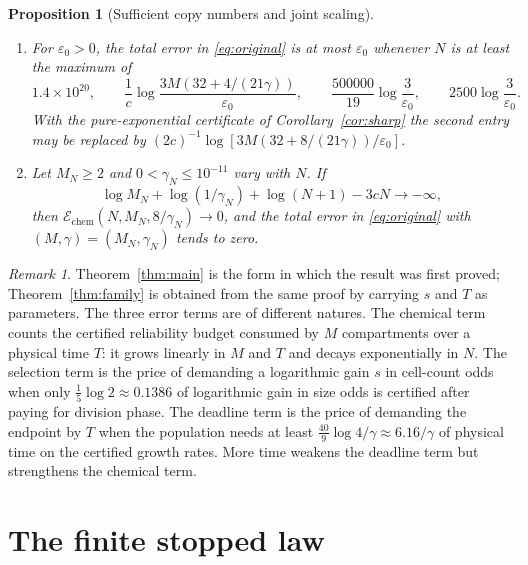 \documentclass[11pt,a4paper]{article}
\theoremstyle{plain}
\newtheorem{proposition}[theorem]{Proposition}
\theoremstyle{definition}
\theoremstyle{remark}
\newtheorem{remark}[theorem]{Remark}
\newcommand{\eps}{\varepsilon}
\newcommand{\chem}{\mathcal E_{\mathrm{chem}}}
\begin{document}
\begin{proposition}[Sufficient copy numbers and joint scaling]\label{prop:thresholds}
\begin{enumerate}[label=(\roman*)]
\item For $\eps_0>0$, the total error in \eqref{eq:original} is at most $\eps_0$ whenever $N$ is at least the maximum of
\begin{equation}\label{eq:threshold}
1.4\times10^{20},\qquad \frac1c\log\frac{3M(32+4/(21\gamma))}{\eps_0},\qquad \frac{500000}{19}\log\frac3{\eps_0},\qquad 2500\log\frac3{\eps_0}.
\end{equation}
With the pure-exponential certificate of Corollary~\ref{cor:sharp} the second entry may be replaced by $(2c)^{-1}\log[3M(32+8/(21\gamma))/\eps_0]$.
\item Let $M_N\geq2$ and $0<\gamma_N\leq10^{-11}$ vary with $N$. If
\begin{equation}\label{eq:scaling}
\log M_N+\log(1/\gamma_N)+\log(N+1)-3cN\longrightarrow-\infty,
\end{equation}
then $\chem(N,M_N,8/\gamma_N)\to0$, and the total error in \eqref{eq:original} with $(M,\gamma)=(M_N,\gamma_N)$ tends to zero.
\end{enumerate}
\end{proposition}

\begin{remark}
Theorem~\ref{thm:main} is the form in which the result was first proved; Theorem~\ref{thm:family} is obtained from the same proof by carrying $s$ and $T$ as parameters. The three error terms are of different natures. The chemical term counts the certified reliability budget consumed by $M$ compartments over a physical time $T$: it grows linearly in $M$ and $T$ and decays exponentially in $N$. The selection term is the price of demanding a logarithmic gain $s$ in cell-count odds when only $\frac15\log2\approx0.1386$ of logarithmic gain in size odds is certified after paying for division phase. The deadline term is the price of demanding the endpoint by $T$ when the population needs at least $\frac{40}{9}\log4/\gamma\approx6.16/\gamma$ of physical time on the certified growth rates. More time weakens the deadline term but strengthens the chemical term.
\end{remark}

\section{The finite stopped law}\label{sec:finitelaw}
\end{document}

